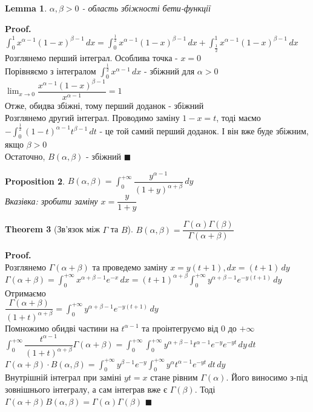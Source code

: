 \documentclass[a4paper, 14pt]{extarticle}
\def\huge{\displaystyle}
\theoremstyle{theoremdd}
\newtheorem{theorem}{Theorem}[subsection]
\theoremstyle{theoremdd}
\theoremstyle{theoremdd}
\newtheorem{proposition}[theorem]{Proposition}
\theoremstyle{theoremdd}
\theoremstyle{theoremdd}
\theoremstyle{theoremdd}
\newtheorem{lemma}[theorem]{Lemma}
\theoremstyle{theoremdd}
\newenvironment{pf}{\vspace*{-3mm} \textbf{Proof. \\}}{$\blacksquare$}
\begin{document}
\begin{lemma}
$\alpha, \beta >0$ - область збіжності бети-функції
\end{lemma}

\begin{pf}
$\huge \int_0^1 x^{\alpha-1} (1-x)^{\beta-1}\,dx = \int_0^{\frac{1}{2}} x^{\alpha-1} (1-x)^{\beta-1}\,dx +  \int_{\frac{1}{2}}^1 x^{\alpha-1} (1-x)^{\beta-1}\,dx$\\
Розглянемо перший інтеграл. Особлива точка - $x =0$\\
Порівняємо з інтегралом $\huge \int_0^{\frac{1}{2}} x^{\alpha - 1} \,dx$ - збіжний для $\alpha > 0$\\
$\huge \lim_{x \to 0} \dfrac{x^{\alpha-1}(1-x)^{\beta-1}}{x^{\alpha-1}} = 1$\\
Отже, обидва збіжні, тому перший доданок - збіжний\\
Розглянемо другий інтеграл. Проводимо заміну $1-x=t$, тоді маємо\\
$-\huge \int_{0}^{\frac{1}{2}} (1-t)^{\alpha-1} t^{\beta - 1}\,dt$ - це той самий перший доданок. І він вже буде збіжним, якщо $\beta > 0$\\
Остаточно, $B(\alpha, \beta)$ - збіжний
\end{pf}

\begin{proposition}
$B(\alpha, \beta) = \huge \int_0^{+\infty} \dfrac{y^{\alpha-1}}{(1+y)^{\alpha+\beta}}\,dy$\\
\textit{Вказівка: зробити заміну} $x = \dfrac{y}{1+y}$
\end{proposition}

\begin{theorem}[Зв'язок між $\Gamma$ та $B$]
$B(\alpha,\beta) = \dfrac{\Gamma(\alpha) \Gamma(\beta)}{\Gamma(\alpha+\beta)}$
\end{theorem}

\begin{pf}
Розглянемо $\Gamma(\alpha+\beta)$ та проведемо заміну $x = y(t+1), dx = (t+1)\,dy$\\
$\Gamma(\alpha+\beta) = \huge \int_0^{+\infty} x^{\alpha+\beta-1} e^{-x}\,dx = (t+1)^{\alpha+\beta} \int_0^{+\infty} y^{\alpha+\beta-1}e^{-y(t+1)}\,dy$\\
Отримаємо\\
$\dfrac{\Gamma(\alpha+\beta)}{(1+t)^{\alpha+\beta}} = \huge \int_0^{+\infty} y^{\alpha+\beta-1}e^{-y(t+1)}\,dy$\\
Помножимо обидві частини на $t^{\alpha-1}$ та проінтегруємо від $0$ до $+\infty$\\
$\huge \int_0^{+\infty} \dfrac{t^{\alpha-1}}{(1+t)^{\alpha+\beta}} \Gamma(\alpha+\beta) = \huge \int_0^{+\infty} \int_0^{+\infty} y^{\alpha+\beta-1} t^{\alpha-1}e^{-y}e^{-yt}\,dy\,dt$\\
$\Gamma(\alpha+\beta) \cdot B(\alpha,\beta) = \huge \int_0^{+\infty} y^{\beta-1} e^{-y} \int_0^{+\infty} y^{\alpha} t^{\alpha-1}e^{-yt}\,dt \,dy$\\
Внутрішній інтеграл при заміні $yt = x$ стане рівним $\Gamma(\alpha)$. Його виносимо з-під зовнішнього інтегралу, а сам інтеграв вже є $\Gamma(\beta)$. Тоді\\
$\Gamma(\alpha+\beta) B(\alpha, \beta) = \Gamma(\alpha) \Gamma(\beta)$
\end{pf}
\end{document}
